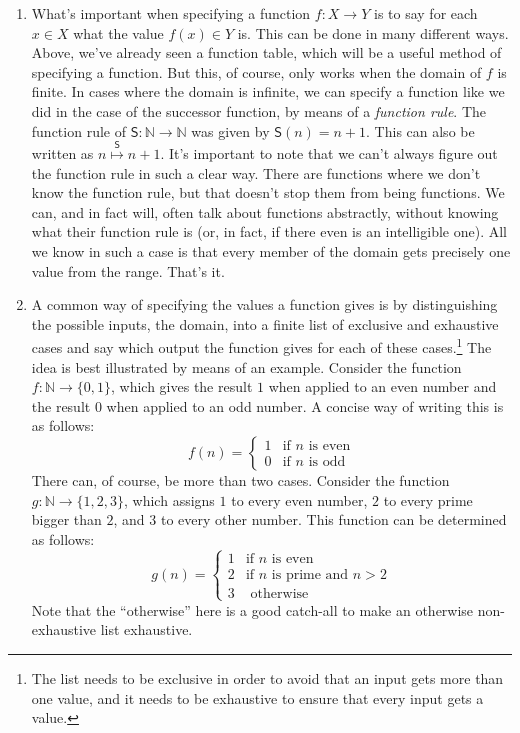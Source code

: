 \begin{enumerate}[\thesection.1]
\item What's important when specifying a function $f:X\to Y$ is to say for each $x\in X$ what the value $f(x)\in Y$ is. This can be done in many different ways. Above, we've already seen a function table, which will be a useful method of specifying a function. But this, of course, only works when the domain of $f$ is finite. In cases where the domain is infinite, we can specify a function like we did in the case of the successor function, by means of a \emph{function rule}. The function rule of $\mathsf{S}:\mathbb{N}\to \mathbb{N}$ was given by $\mathsf{S}(n)=n+1$. This can also be written as $n\overset{\mathsf{S}}{\mapsto}n+1$. It's important to note that we can't always figure out the function rule in such a clear way. There are functions where we don't know the function rule, but that doesn't stop them from being functions. We can, and in fact will, often talk about functions abstractly, without knowing what their function rule is (or, in fact, if there even is an intelligible one). All we know in such a case is that every member of the domain gets precisely one value from the range. That's it.

\item A common way of specifying the values a function gives is by distinguishing the possible inputs, the domain, into a finite list of exclusive and exhaustive cases and say which output the function gives for each of these cases.\footnote{The list needs to be exclusive in order to avoid that an input gets more than one value, and it needs to be exhaustive to ensure that every input gets a value.} The idea is best illustrated by means of an example. Consider the function $f:\mathbb{N}\to\{0,1\}$, which gives the result $1$ when applied to an even number and the result $0$ when applied to an odd number. A concise way of writing this is as follows: \[f(n)=\begin{cases} 1 & \text{if }n\text{ is even}\\0 &\text{if }n\text{ is odd}\end{cases}\] There can, of course, be more than two cases. Consider the function $g:\mathbb{N}\to\{1, 2, 3\}$, which assigns $1$ to every even number, $2$ to every prime bigger than $2$, and $3$ to every other number. This function can be determined as follows:
\[g(n)=\begin{cases} 1 & \text{if }n\text{ is even}\\2 &\text{if }n\text{ is prime and }n>2\\3&\text{ otherwise}\end{cases}\] Note that the ``otherwise'' here is a good catch-all to make an otherwise non-exhaustive list exhaustive.


\end{enumerate}
